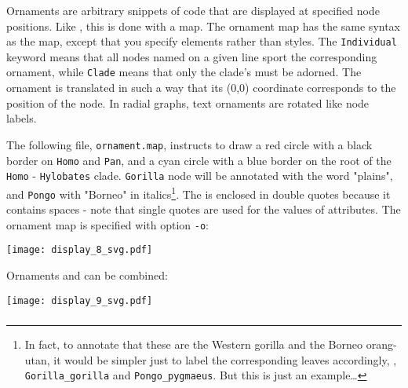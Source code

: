 Ornaments are arbitrary snippets of \svg{} code that are displayed at specified
node positions. Like \css, this is done with a map. The ornament map has the
same syntax as the \css{} map, except that you specify \svg{} elements rather
than \css{} styles. The \texttt{Individual} keyword means that all nodes named
on a given line sport the corresponding ornament, while \texttt{Clade} means
that only the clade's \lca{} must be adorned. The ornament is translated in
such a way that its (0,0) coordinate corresponds to the position of the node.
In radial graphs, text ornaments are rotated like node labels.

The following file, \texttt{ornament.map}, instructs to draw a red circle with
a black border on \texttt{Homo} and \texttt{Pan}, and a cyan circle with a blue
border on the root of the \texttt{Homo} - \texttt{Hylobates} clade.
\texttt{Gorilla} node will be annotated with the word "plains", and
\texttt{Pongo} with "Borneo" in italics\footnote{In fact, to annotate that these
are the Western gorilla and the Borneo orang-utan, it would be simpler just to
label the corresponding leaves accordingly, \ie, \texttt{Gorilla\_gorilla} and
\texttt{Pongo\_pygmaeus}. But this is just an example\ldots}. The \svg{}
is enclosed in double quotes because it contains spaces - note that single
quotes are used for the values of \xml{} attributes. The ornament map is
specified with option \texttt{-o}:
\begin{quote}
 
\end{quote}

\begin{center}
 \texttt{[image: display\_8\_svg.pdf]}
\end{center}

\noindent{}Ornaments and \css{} can be combined:


\begin{center}
 \texttt{[image: display\_9\_svg.pdf]}
\end{center}

\subsubsection{\libxml}
\label{sct:display:libxml}

